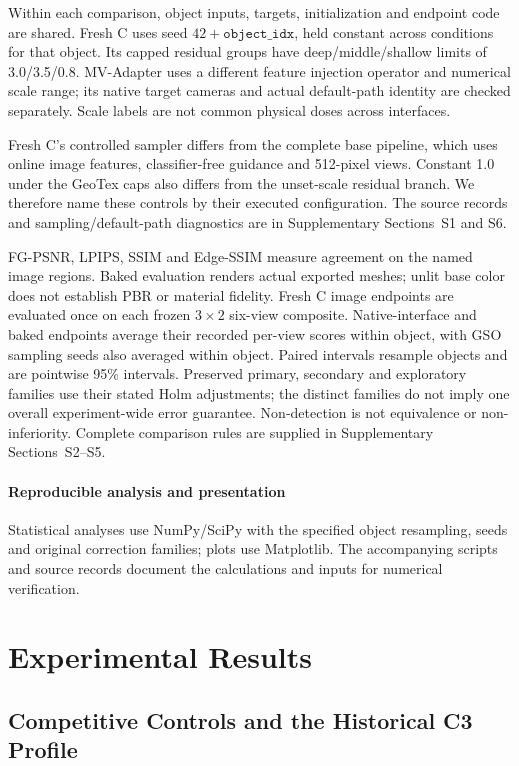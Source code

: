 \documentclass[times,twocolumn,final]{elsarticle}
\begin{document}
Within each comparison, object inputs, targets, initialization and endpoint code are shared. Fresh C uses seed $42+\texttt{object\_idx}$, held constant across conditions for that object. Its capped residual groups have deep/middle/shallow limits of 3.0/3.5/0.8. MV-Adapter uses a different feature injection operator and numerical scale range; its native target cameras and actual default-path identity are checked separately. Scale labels are not common physical doses across interfaces.

Fresh C's controlled sampler differs from the complete base pipeline, which uses online image features, classifier-free guidance and 512-pixel views. Constant 1.0 under the GeoTex caps also differs from the unset-scale residual branch. We therefore name these controls by their executed configuration. The source records and sampling/default-path diagnostics are in Supplementary Sections~S1 and S6.

FG-PSNR, LPIPS, SSIM and Edge-SSIM measure agreement on the named image regions. Baked evaluation renders actual exported meshes; unlit base color does not establish PBR or material fidelity. Fresh C image endpoints are evaluated once on each frozen $3\times2$ six-view composite. Native-interface and baked endpoints average their recorded per-view scores within object, with GSO sampling seeds also averaged within object. Paired intervals resample objects and are pointwise 95\% intervals. Preserved primary, secondary and exploratory families use their stated Holm adjustments; the distinct families do not imply one overall experiment-wide error guarantee. Non-detection is not equivalence or non-inferiority. Complete comparison rules are supplied in Supplementary Sections~S2--S5.

\paragraph{Reproducible analysis and presentation}
Statistical analyses use NumPy/SciPy with the specified object resampling, seeds and original correction families; plots use Matplotlib. The accompanying scripts and source records document the calculations and inputs for numerical verification.

\section{Experimental Results}
\label{sec:experiments}

\subsection{Competitive Controls and the Historical C3 Profile}
\label{subsec:largescale}
\end{document}
